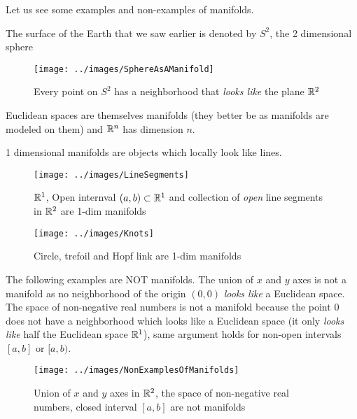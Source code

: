 Let us see some examples and non-examples of manifolds.

\begin{example}[$S^2$]
	The surface of the Earth that we saw earlier is denoted by $S^2$, the 2 dimensional sphere
	\begin{figure}[ht]
		\centering \texttt{[image: ../images/SphereAsAManifold]}
		\caption{Every point on $S^2$ has a neighborhood that \emph{looks like} the plane $\mathbb{R}^2$}
	\end{figure}
\end{example}

\begin{example}[$\R^n$]
	Euclidean spaces are themselves manifolds (they better be as manifolds are modeled on them) and $\R^n$ has dimension $n$.
\end{example}



\begin{example}
	1 dimensional manifolds are objects which locally look like lines.
	\begin{figure}[H]
		\centering \texttt{[image: ../images/LineSegments]}
		\caption{$\mathbb{R}^1$, Open internval $(a,b) \subset \mathbb{R}^1$ and collection of \textit{open} line segments in $\mathbb{R}^2$ are 1-dim manifolds}
	\end{figure}
	\begin{figure}[H]
		\centering \texttt{[image: ../images/Knots]}
		\caption{Circle, trefoil and Hopf link are 1-dim manifolds}
	\end{figure}

	The following examples are NOT manifolds. The union of $x$ and $y$ axes is not a manifold as no neighborhood of the origin $(0,0)$ \emph{looks like} a Euclidean space. The space of non-negative real numbers is not a manifold because the point $0$ does not have a neighborhood which looks like a Euclidean space (it only \emph{looks like} half the Euclidean space $\mathbb{R}^1$), same argument holds for non-open intervals $[a,b]$ or $[a,b)$.
		\begin{figure}[H]
			\centering \texttt{[image: ../images/NonExamplesOfManifolds]}
			\caption{Union of $x$ and $y$ axes in $\mathbb{R}^2$, the space of non-negative real numbers, closed interval $[a,b]$ are not manifolds}
		\end{figure}
	\end{example}



